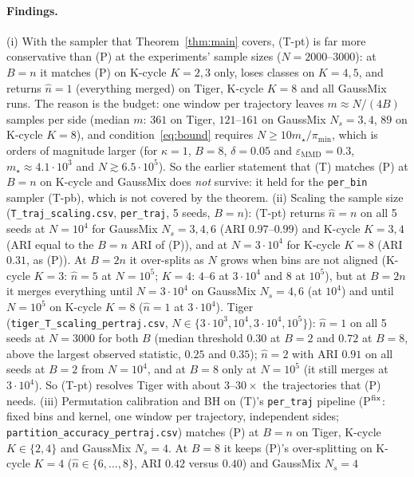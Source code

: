 \documentclass[10pt]{article}
\newcommand{\epsMMD}{\varepsilon_{\mathrm{MMD}}}
\begin{document}
\paragraph{Findings.}
(i) With the sampler that Theorem~\ref{thm:main} covers, (T-pt) is far more
conservative than (P) at the experiments' sample sizes ($N=2000$--$3000$): at
$B=n$ it matches (P) on K-cycle $K=2,3$ only, loses classes on $K=4,5$, and
returns $\hat n=1$ (everything merged) on Tiger, K-cycle $K=8$ and all
GaussMix runs.  The reason is the budget: one window per trajectory leaves
$m\approx N/(4B)$ samples per side (median $m$: $361$ on Tiger, $121$--$161$ on
GaussMix $N_s=3,4$, $89$ on K-cycle $K=8$), and condition~\eqref{eq:bound}
requires $N\ge10m_\star/\pi_{\min}$, which is orders of magnitude larger (for
$\kappa=1$, $B=8$, $\delta=0.05$ and $\epsMMD=0.3$,
$m_\star\approx4.1\cdot10^3$ and $N\gtrsim6.5\cdot10^5$).  So the earlier
statement that (T) matches (P) at $B=n$ on K-cycle and GaussMix does \emph{not}
survive: it held for the \texttt{per\_bin} sampler (T-pb), which is not covered by
the theorem.  (ii) Scaling the sample size
(\texttt{T\_traj\_scaling.csv}, \texttt{per\_traj}, 5 seeds, $B=n$): (T-pt)
returns $\hat n=n$ on all 5 seeds at $N=10^4$ for GaussMix $N_s=3,4,6$
(ARI $0.97$--$0.99$) and K-cycle $K=3,4$ (ARI equal to the $B=n$ ARI of (P)), and
at $N=3\cdot10^4$ for K-cycle $K=8$ (ARI $0.31$, as (P)).  At $B=2n$ it
over-splits as $N$ grows when bins are not aligned (K-cycle $K=3$: $\hat n=5$
at $N=10^5$; $K=4$: $4$--$6$ at $3\cdot10^4$ and $8$ at $10^5$), but at $B=2n$ it
merges everything until $N=3\cdot10^4$ on GaussMix $N_s=4,6$ (at $10^4$) and until
$N=10^5$ on K-cycle $K=8$ ($\hat n=1$ at $3\cdot10^4$).  Tiger
(\texttt{tiger\_T\_scaling\_pertraj.csv}, $N\in\{3\cdot10^3,10^4,3\cdot10^4,10^5\}$): $\hat n=1$ on all
5 seeds at $N=3000$ for both $B$ (median threshold $0.30$ at $B=2$ and $0.72$ at
$B=8$, above the largest observed statistic, $0.25$ and $0.35$); $\hat n=2$ with ARI
$0.91$ on all seeds at $B=2$ from $N=10^4$, and at $B=8$ only at $N=10^5$ (it
still merges at $3\cdot10^4$).  So (T-pt) resolves Tiger with about $3$--$30\times$
the trajectories that (P) needs.  (iii) Permutation calibration and BH on (T)'s
\texttt{per\_traj} pipeline (P$^{\rm fix}$: fixed bins and kernel, one window per
trajectory, independent sides; \texttt{partition\_accuracy\_pertraj.csv}) matches
(P) at $B=n$ on Tiger, K-cycle $K\in\{2,4\}$ and GaussMix $N_s=4$.
At $B=8$ it keeps (P)'s over-splitting on K-cycle $K=4$
($\hat n\in\{6,\dots,8\}$, ARI $0.42$ versus $0.40$) and GaussMix $N_s=4$
\end{document}
